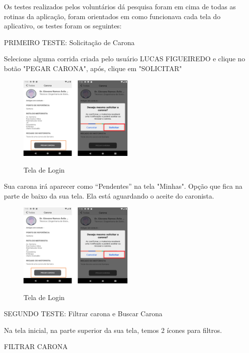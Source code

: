 Os testes realizados pelos voluntários dá pesquisa foram em cima de todas as rotinas da aplicação, foram orientados em como funcionava cada tela do aplicativo, os testes foram os seguintes:

PRIMEIRO TESTE: Solicitação de Carona

Selecione alguma corrida criada pelo usuário LUCAS FIGUEIREDO e clique no botão
"PEGAR CARONA", após, clique em "SOLICITAR"

\begin{figure}[H]
	\centering
	\caption{Tela de Login}
	\includegraphics[width=0.5\textwidth]{./04-figuras/manual/solicitacao_de_carona.png}
	\label{fig:solicitacao_de_carona}
\end{figure}

Sua carona irá aparecer como “Pendentes” na tela "Minhas". Opção que fica na parte de baixo da sua tela. Ela está aguardando o aceite do caronista.

\begin{figure}[H]
	\centering
	\caption{Tela de Login}
	\includegraphics[width=0.5\textwidth]{./04-figuras/manual/solicitacao_de_carona.png}
	\label{fig:solicitacao_de_carona_2}
\end{figure}

SEGUNDO TESTE: Filtrar carona e Buscar Carona

Na tela inicial, na parte superior da sua tela, temos 2 ícones para filtros.

FILTRAR CARONA

